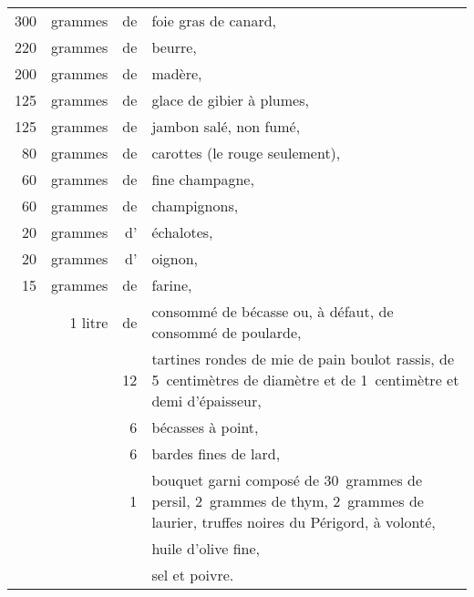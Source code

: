 \footnotesize
\begin{longtable}{rrrp{16em}}
    300 & grammes & de & foie gras de canard,                                                             \\
    220 & grammes & de & beurre,                                                                          \\
    200 & grammes & de & madère,                                                                          \\
    125 & grammes & de & glace de gibier à plumes,                                                        \\
    125 & grammes & de & jambon salé, non fumé,                                                           \\
     80 & grammes & de & carottes (le rouge seulement),                                                   \\
     60 & grammes & de & fine champagne,                                                                  \\
     60 & grammes & de & champignons,                                                                     \\
     20 & grammes & d' & échalotes,                                                                       \\
     20 & grammes & d' & oignon,                                                                          \\
     15 & grammes & de & farine,                                                                          \\
        & 1 litre & de & consommé de bécasse ou, à défaut, de consommé de poularde,                       \\
        &         & 12 & tar\-tines rondes de mie de pain bou\-lot ras\-sis,
                         de 5 cen\-ti\-mètres de dia\-mètre et de 1 cen\-ti\-mètre
                         et demi d'é\-pais\-seur,                                                         \\
        &         &  6 & bécasses à point,                                                                \\
        &         &  6 & bardes fines de lard,                                                            \\
        &         &  1 & bouquet garni composé de 30 gram\-mes de persil,
                         2 gram\-mes de thym, 2 gram\-mes de lau\-rier,
                         truf\-fes noires du P\-é\-ri\-gord, à vo\-lonté,                                 \\
        &         &    & huile d'olive fine,                                                              \\
        &         &    & sel et poivre.                                                                   \\
\end{longtable}
\normalsize

